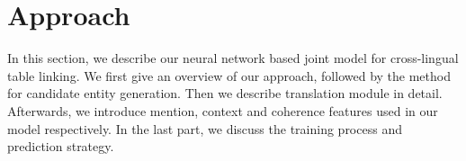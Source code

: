 \section{Approach}
\label{sec:approach}
In this section, we describe our neural network based joint model for cross-lingual table linking. We first give an overview of our approach, followed by the method for candidate entity generation. Then we describe translation module in detail. Afterwards, we introduce mention, context and coherence features used in our model respectively. In the last part, we discuss the training process and prediction strategy.

 




